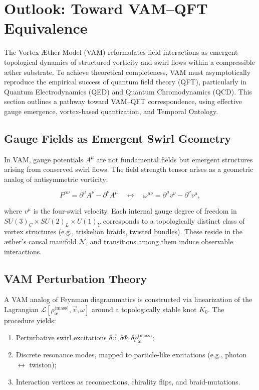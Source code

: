 \section{Outlook: Toward VAM--QFT Equivalence}
\label{sec:vam_qft_outlook}

The Vortex \AE{}ther Model (VAM) reformulates field interactions as emergent topological dynamics of structured vorticity and swirl flows within a compressible æther substrate. To achieve theoretical completeness, VAM must asymptotically reproduce the empirical success of quantum field theory (QFT), particularly in Quantum Electrodynamics (QED) and Quantum Chromodynamics (QCD). This section outlines a pathway toward VAM--QFT correspondence, using effective gauge emergence, vortex-based quantization, and Temporal Ontology.

\subsection{Gauge Fields as Emergent Swirl Geometry}

In VAM, gauge potentials \( A^\mu \) are not fundamental fields but emergent structures arising from conserved swirl flows. The field strength tensor arises as a geometric analog of antisymmetric vorticity:

\begin{equation}
F^{\mu\nu} = \partial^\mu A^\nu - \partial^\nu A^\mu
\quad \leftrightarrow \quad
\omega^{\mu\nu} = \partial^\mu v^\nu - \partial^\nu v^\mu,
\end{equation}

where \( v^\mu \) is the four-swirl velocity. Each internal gauge degree of freedom in \( SU(3)_C \times SU(2)_L \times U(1)_Y \) corresponds to a topologically distinct class of vortex structures (e.g., triskelion braids, twisted bundles). These reside in the æther's causal manifold \( \mathcal{N} \), and transitions among them induce observable interactions.

\subsection{VAM Perturbation Theory}

A VAM analog of Feynman diagrammatics is constructed via linearization of the Lagrangian \( \mathcal{L}[\rho_{\text{\ae}}^{\text{(mass)}}, \vec{v}, \omega] \) around a topologically stable knot \( K_0 \). The procedure yields:

\begin{enumerate}
    \item Perturbative swirl excitations \( \delta \vec{v}, \delta \Phi, \delta \rho_{\text{\ae}}^{\text{(mass)}} \);
    \item Discrete resonance modes, mapped to particle-like excitations (e.g., photon $\leftrightarrow$ twiston);
    \item Interaction vertices as reconnections, chirality flips, and braid-mutations.
\end{enumerate}

